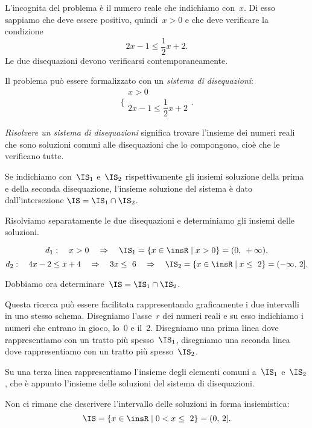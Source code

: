 \begin{soluzione}
 L'incognita del problema è il numero reale che indichiamo con~$x$. Di esso
sappiamo che deve essere positivo, quindi~$x>0$ e che deve verificare
la condizione
\[2x-1\le \frac{1}{2}x+2.\]
Le due disequazioni devono
verificarsi contemporaneamente.

Il problema può essere formalizzato con un \emph{sistema di disequazioni}:
\[\bigg \{%
\begin{array}{l}
 x>0\\
 2x-1\le\dfrac{1}{2}x+2
\end{array}.\]



\emph{Risolvere un sistema di disequazioni} significa trovare
l'insieme dei numeri reali che sono soluzioni comuni
alle disequazioni che lo compongono, cioè che le verificano tutte.

Se indichiamo con~$\IS_{1}$ e~$\IS_{2}$
rispettivamente gli insiemi soluzione della prima e della seconda
disequazione, l'insieme soluzione del sistema è dato
dall'intersezione
$\IS=\IS_{1}\cap\IS_{2}$.
\pagebreak

Risolviamo separatamente le due disequazioni e determiniamo gli
insiemi delle soluzioni.

\[d_1:\quad x>0\quad\Rightarrow\quad \IS_{1}=\{x\in\insR\mid x>0\}=(0\text{,~}+\infty)\text{,}\]
\[d_2:\quad 4x-2\le x+4\quad\Rightarrow\quad 3x\le~6\quad\Rightarrow\quad\IS_{2}=\{x\in \insR\mid x\le~2\}=(-\infty\text{,~}2].\]

Dobbiamo ora determinare~$\IS=\IS_{1}\cap\IS_{2}$.

Questa ricerca può essere facilitata rappresentando graficamente i due
intervalli in uno stesso schema. Disegniamo l'asse~$r$ dei
numeri reali e su esso indichiamo i numeri che entrano in gioco, lo~0
e il~2. Disegniamo una prima linea dove rappresentiamo con un tratto più
spesso~$\IS_{1}$, disegniamo una seconda linea dove
rappresentiamo con un tratto più spesso~$\IS_2$.

Su una terza linea rappresentiamo l'insieme degli
elementi comuni a~$\IS_{1}$ e~$\IS_{2}$, che
è appunto l'insieme delle soluzioni del sistema di
disequazioni.
\begin{center}
 
\end{center}

Non ci rimane che descrivere
l'intervallo delle soluzioni in forma insiemistica:
\[\IS=\{x\in \insR\mid 0<x\le~2\}=(0\text{,~}2].\]

\end{soluzione}


